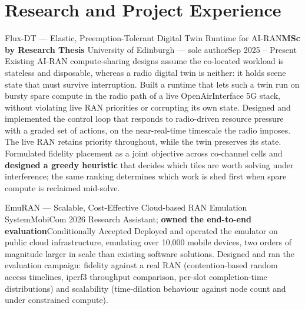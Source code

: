 \section{Research and Project Experience}
  \resumeSubHeadingListStart

    \resumeSubheading
      {Flux-DT --- Elastic, Preemption-Tolerant Digital Twin Runtime for AI-RAN}{\textbf{MSc by Research Thesis}}
      {University of Edinburgh --- sole author}{Sep 2025 -- Present}
      \resumeItemListStart
          {Existing AI-RAN compute-sharing designs assume the co-located workload is stateless and disposable, whereas a radio digital twin is neither: it holds scene state that must survive interruption. Built a runtime that lets such a twin run on bursty spare compute in the radio path of a live OpenAirInterface 5G stack, without violating live RAN priorities or corrupting its own state.}
          {Designed and implemented the control loop that responds to radio-driven resource pressure with a graded set of actions, on the near-real-time timescale the radio imposes. The live RAN retains priority throughout, while the twin preserves its state.}
          {Formulated fidelity placement as a joint objective across co-channel cells and \textbf{designed a greedy heuristic} that decides which tiles are worth solving under interference; the same ranking determines which work is shed first when spare compute is reclaimed mid-solve.}
      \resumeItemListEnd

    \resumeSubheading
      {EmuRAN --- Scalable, Cost-Effective Cloud-based RAN Emulation System}{MobiCom 2026}
      {Research Assistant; \textbf{owned the end-to-end evaluation}}{Conditionally Accepted}
      \resumeItemListStart
          {Deployed and operated the emulator on public cloud infrastructure, emulating over 10,000 mobile devices, two orders of magnitude larger in scale than existing software solutions.}
          {Designed and ran the evaluation campaign: fidelity against a real RAN (contention-based random access timelines, iperf3 throughput comparison, per-slot completion-time distributions) and scalability (time-dilation behaviour against node count and under constrained compute).}
      \resumeItemListEnd

